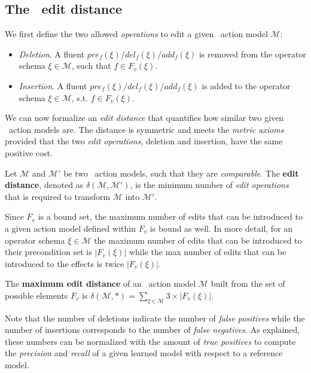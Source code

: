 \subsection{The \strips\ edit distance}

We first define the two allowed \emph{operations} to edit a given \strips\ action model $\mathcal{M}$:
\begin{itemize}
\item {\em Deletion}. A fluent $pre_f(\xi)/del_f(\xi)/add_f(\xi)$ is removed from the operator schema $\xi\in\mathcal{M}$, such that $f\in F_v(\xi)$.
\item {\em Insertion}. A fluent $pre_f(\xi)/del_f(\xi)/add_f(\xi)$ is added to the operator schema $\xi\in\mathcal{M}$, s.t. $f\in F_v(\xi)$.
\end{itemize}

We can now formalize an {\em edit distance} that quantifies how similar two given \strips\ action models are. The distance is symmetric and meets the {\em metric axioms} provided that the two {\em edit operations}, deletion and insertion, have the same positive cost.

\begin{mydefinition}
  Let $\mathcal{M}$ and $\mathcal{M}'$ be two \strips\ action models, such that they are {\em comparable}. The {\bf edit distance}, denoted as $\delta(\mathcal{M},\mathcal{M}')$, is the minimum number of {\em edit operations} that is required to transform $\mathcal{M}$ into $\mathcal{M}'$.
\end{mydefinition}

Since $F_v$ is a bound set, the maximum number of edits that can be introduced to a given action model defined within $F_v$ is bound as well. In more detail, for an operator schema $\xi\in\mathcal{M}$ the maximum number of edits that can be introduced to their precondition set is $|F_v(\xi)|$ while the max number of edits that can be introduced to the effects is twice $|F_v(\xi)|$.
\begin{mydefinition}
The \textbf{maximum edit distance} of an \strips\ action model $\mathcal{M}$ built from the set of possible elements $F_v$ is $\delta(\mathcal{M},*)=\sum_{\xi\in\mathcal{M}} 3\times|F_v(\xi)|$.
\end{mydefinition}

Note that the number of deletions indicate the number of {\em false positives} while the number of insertions corresponds to the number of {\em false negatives}. As explained, these numbers can be normalized with the amount of {\em true positives} to compute the {\em precision} and {\em recall} of a given learned model with respect to a reference model.

